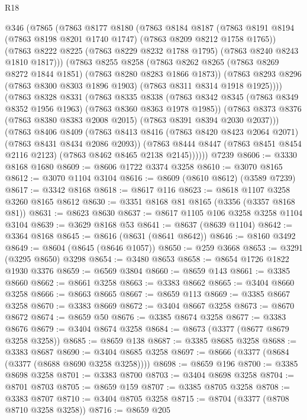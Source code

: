 \begin{lexlean}{R18}
\begin{coremodule}
    @346
      (@7865
        (@7863
          @8177
          @8180
          (@7863
            @8184
            @8187
            (@7863 @8191 @8194 (@7863 @8198 @8201 @1740 @1747) (@7863 @8209 @8212 @1758 @1765))
            (@7863 @8222 @8225 (@7863 @8229 @8232 @1788 @1795) (@7863 @8240 @8243 @1810 @1817)))
          (@7863
            @8255
            @8258
            (@7863 @8262 @8265 (@7863 @8269 @8272 @1844 @1851) (@7863 @8280 @8283 @1866 @1873))
            (@7863 @8293 @8296 (@7863 @8300 @8303 @1896 @1903) (@7863 @8311 @8314 @1918 @1925))))
        (@7863
          @8328
          @8331
          (@7863
            @8335
            @8338
            (@7863 @8342 @8345 (@7863 @8349 @8352 @1956 @1963) (@7863 @8360 @8363 @1978 @1985))
            (@7863 @8373 @8376 (@7863 @8380 @8383 @2008 @2015) (@7863 @8391 @8394 @2030 @2037)))
          (@7863
            @8406
            @8409
            (@7863 @8413 @8416 (@7863 @8420 @8423 @2064 @2071) (@7863 @8431 @8434 @2086 @2093))
            (@7863 @8444 @8447 (@7863 @8451 @8454 @2116 @2123) (@7863 @8462 @8465 @2138 @2145))))))
    @7239
@8606 := @3330 @8168 @1680
@8609 := @8606 @1722 @3374 @3258
@8610 := @3070 @8165
@8612 := @3070 @1104 @3104
@8616 := @8609 (@8610 @8612) (@3589 @7239)
@8617 := @3342 @8168
@8618 := @8617 @116
@8623 := @8618 @1107 @3258 @3260 @8165 @8612
@8630 := @3351 @8168 @81 @8165 (@3356 (@3357 @8168 @81))
@8631 := @8623 @8630
@8637 := @8617 @1105 @106 @3258 @3258 @1104 @3104
@8639 := @3629 @8168 @53
@8641 := @8637 (@8639 @1104)
@8642 := @3364 @8168
@8645 := @8616 (@8631 (@8641 @8642))
@8646 := @8160 @3492
@8649 := @8604 (@8645 (@8646 @1057))
@8650 := @259 @3668
@8653 := @3291 (@3295 @8650) @3298
@8654 := @3480 @8653
@8658 := @8654 @1726 @1822 @1930 @3376
@8659 := @6569 @3804
@8660 := @8659 @143
@8661 := @3385 @8660
@8662 := @8661 @3258
@8663 := @3383 @8662
@8665 := @3404 @8660 @3258
@8666 := @8663 @8665
@8667 := @8659 @113
@8669 := @3385 @8667 @3258
@8670 := @3383 @8669
@8672 := @3404 @8667 @3258
@8673 := @8670 @8672
@8674 := @8659 @50
@8676 := @3385 @8674 @3258
@8677 := @3383 @8676
@8679 := @3404 @8674 @3258
@8684 := @8673 (@3377 (@8677 @8679 @3258 @3258))
@8685 := @8659 @138
@8687 := @3385 @8685 @3258
@8688 := @3383 @8687
@8690 := @3404 @8685 @3258
@8697 := @8666 (@3377 (@8684 (@3377 (@8688 @8690 @3258 @3258))))
@8698 := @8659 @196
@8700 := @3385 @8698 @3258
@8701 := @3383 @8700
@8703 := @3404 @8698 @3258
@8704 := @8701 @8703
@8705 := @8659 @159
@8707 := @3385 @8705 @3258
@8708 := @3383 @8707
@8710 := @3404 @8705 @3258
@8715 := @8704 (@3377 (@8708 @8710 @3258 @3258))
@8716 := @8659 @205

\end{coremodule}
\end{lexlean}

